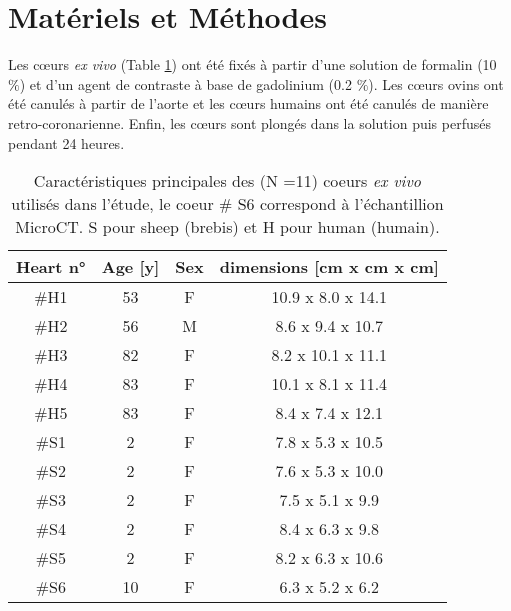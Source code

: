 \section{Matériels et Méthodes}
Les cœurs \textit{ex vivo} (Table \ref{tab:table1}) ont été fixés à partir d’une solution de formalin (10 $\%$) et d’un agent de contraste à base de gadolinium (0.2 $\%$). Les cœurs ovins ont été canulés à partir de l’aorte et les cœurs humains ont été canulés de manière retro-coronarienne. Enfin, les cœurs sont plongés dans la solution puis perfusés pendant 24 heures.	
\begin{table}[!ht]
\large
\begin{tabular}{cccc}
\hline
\textbf{Heart n°}  &  \textbf{Age [y]} & \textbf{Sex} & \textbf{dimensions [cm x cm x cm]} \\
\hline
\hline
\#H1 &   53 &    F &   10.9 x 8.0 x 14.1 \\
\#H2  &   56 &    M &    8.6 x 9.4 x 10.7  \\
\#H3 &   82 &    F &   8.2 x 10.1 x 11.1 \\
\#H4 &   83 &    F &  10.1 x 8.1 x 11.4   \\
\#H5 & 83& F & 8.4 x 7.4 x 12.1\\ 
\hline
\hline
\#S1 &   2 &    F &  7.8 x 5.3 x 10.5  \\
\#S2  &  2 & F & 7.6 x 5.3 x 10.0  \\
\#S3 & 2 & F& 7.5 x 5.1 x 9.9 \\
\#S4 &  2 & F & 8.4 x 6.3 x 9.8\\
\#S5 & 2& F& 8.2 x 6.3 x 10.6\\ 
\#S6 & 10& F & 6.3 x 5.2 x 6.2\\ 

\hline

\end{tabular}
\label{tab:table1}
\caption{Caractéristiques principales des (N =11) coeurs \textit{ex vivo} utilisés dans l'étude, le coeur \# S6 correspond à l'échantillion MicroCT. S pour sheep (brebis) et H pour human (humain).}
\end{table}

